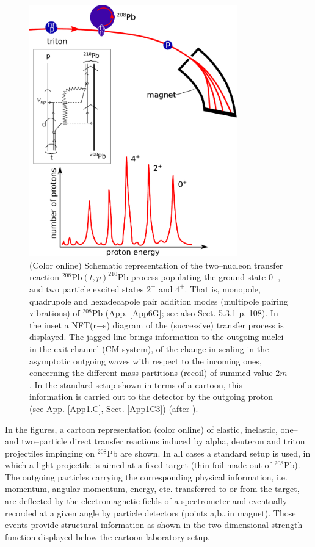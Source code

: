 \begin{figure}
\centerline {
\includegraphics*[width=9cm]{introduccion/figs/figintro3}
}
\caption{(Color online) Schematic representation of the two--nucleon transfer reaction $^{208}$Pb$(t,p)^{210}$Pb process populating the ground state $0^+$, and two particle excited states $2^+$ and $4^+$.  That is, monopole, quadrupole and hexadecapole pair addition modes (multipole pairing vibrations) of $^{208}$Pb   (App. \ref{App6G}; see also \cite{Brink:05} Sect. 5.3.1 p. 108). In the inset a NFT(r+s) diagram of the (successive) transfer process is displayed. The jagged line brings information to the outgoing nuclei in the exit channel (CM system), of the change in scaling in the asymptotic outgoing waves with respect to the incoming ones, concerning the different mass partitions (recoil) of summed value 2$m$. In the standard setup shown in terms of a cartoon, this information is carried out to the detector by the outgoing proton (see App. \ref{App1.C}, Sect. \ref{App1C3}) (after \cite{Mottelson:76b}).}
\label{figintro3}
\end{figure}

In the figures, a cartoon representation (color online) of elastic, inelastic, one-- and two--particle direct transfer reactions induced by alpha, deuteron and triton  projectiles impinging on $^{208}$Pb are shown. In all cases a standard setup is used, in which a light projectile is aimed at a fixed target (thin foil made out of $^{208}$Pb). The outgoing particles carrying the corresponding physical information, i.e. momentum, angular momentum, energy, etc. transferred to or from the target, are deflected by the electromagnetic fields of a spectrometer and eventually recorded at a given angle by particle detectors (points a,b\dots in magnet). Those events provide structural information as shown in the two dimensional strength function displayed below the cartoon laboratory setup. 

